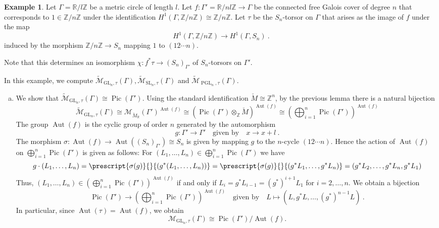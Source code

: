 \documentclass[10pt, a4paper]{amsart}
\theoremstyle{definition}
\newtheorem{example}[theorem]{Example}
\theoremstyle{myitemstyle}
\newcommand{\R}{\mathbb{R}}
\newcommand{\Z}{\mathbb{Z}}
\newcommand{\ZZ}{\mathbb{Z}}
\newcommand{\Mcheck}{{\check{M}}}
\newcommand{\calM}{\mathcal{M}}
\newcommand{\wmc}[1]{{\widetilde{\mathcal{#1}}}}
\DeclareMathOperator{\Pic}{Pic}
\DeclareMathOperator{\Aut}{Aut}
\DeclareMathOperator{\PGL}{PGL}
\newcommand{\SL}{{\mathrm{SL}}}
\newcommand{\GL}{{\mathrm{GL}}}
\newcommand{\Ga}{\Gamma}
\begin{document}
\begin{example} 
\label{ex:computation of MGLn using cover} Let $\Gamma = \R / l\ZZ$ be a metric circle of length $l$. Let $f: \Gamma' = \R/nl\Z \to \Gamma$ be the connected free Galois cover of degree $n$ that corresponds to $1 \in \Z/n\Z$ under the identification $H^1(\Gamma,\Z/n\Z) \cong \Z / n\Z$.
Let $\tau$ be the $S_n$-torsor on $\Gamma$ that arises as the image of $f$ under the map
\[
H^1(\Gamma,\Z/n\Z) \longrightarrow H^1(\Gamma,S_n) \ .
\]
induced by the morphism $\Z/n\Z\to S_n$ mapping $1$ to $(1 2\cdots n)$.

Note that this determines an isomorphism $\chi: f^* \tau \to (S_n)_{\Gamma'}$ of $S_n$-torsors on $\Ga'$.

In this example, we compute $\wmc M_{\GL_n, \tau}(\Gamma), \wmc M_{\SL_n,\tau}(\Gamma)$ and $\wmc M_{\PGL_n,\tau }(\Gamma)$.

\begin{enumerate}[(a)]
    \item
    
    We show that $\wmc M_{\GL_n, \tau}(\Ga) \cong \Pic(\Gamma')$. Using the standard identification $\Mcheck \cong \Z^n$, by the previous lemma there is a natural bijection
    \[
    \wmc M_{\GL_n, \tau}(\Ga) \cong \calM_{\Mcheck_\R}(\Gamma')^{\Aut(f)} \cong (\Pic(\Gamma') \otimes_\Z \Mcheck)^{\Aut(f)} \cong \left(\bigoplus_{i =1}^n \Pic(\Gamma')\right)^{\Aut(f)}
    \]
    The group $\Aut(f)$ is the cyclic group of order $n$ generated by the automorphism $$g: \Gamma' \to \Gamma' \quad\text{given by}\quad x \to x + l\ . $$ The morphism $\sigma: \Aut(f) \to \Aut((S_n)_{\Gamma'}) \cong S_n$ is given by mapping $g$ to the $n$-cycle $(1 2\cdots n)$. Hence the action of $\Aut(f)$ on $\bigoplus_{i =1}^n \Pic(\Gamma')$ is given as follows: For $(L_1,\dots,L_n) \in \bigoplus_{i =1}^n \Pic(\Gamma')$ we have
    \[
    g \cdot (L_1,\dots,L_n) =  \prescript{\sigma(g)}{}{(g^{*}(L_1,\ldots,L_n))} = \prescript{\sigma(g)}{}{(g^{*}L_1,\ldots,g^{*}L_n)}= (g^{*}L_2,\ldots,g^{*}L_n,g^{*}L_1)
    \]
    Thus, $(L_1,\dots,L_n) \in (\bigoplus_{i =1}^n \Pic(\Gamma'))^{\Aut(f)}$ if and only if $L_i = g^{*}L_{i-1} = (g^{*})^{i+1}L_1$ for $i=2,\ldots,n$. We obtain a bijection
    \[
    \Pic(\Gamma') \longrightarrow \left(\bigoplus_{i =1}^n \Pic(\Gamma')\right)^{\Aut(f)} \quad\text{given by}\quad  L \mapsto (L,g^{*}L,\dots,(g^{*})^{n-1}L) \ .
    \]
    In particular, since $\Aut(\tau) = \Aut(f)$, we obtain 
    \[
    \calM_{\GL_n,\tau} (\Gamma) \cong \Pic(\Gamma')/ \Aut(f).
    \]


\end{enumerate}
\end{example}
\end{document}
